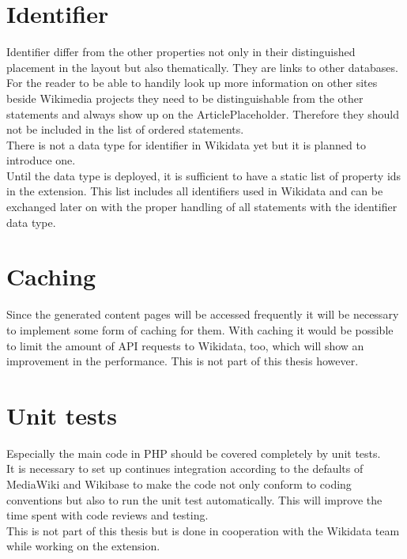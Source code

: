 \section {Identifier}
Identifier differ from the other properties not only in their distinguished placement in the layout but also thematically. They are links to other databases. For the reader to be able to handily look up more information on other sites beside Wikimedia projects they need to be distinguishable from the other statements and always show up on the ArticlePlaceholder. Therefore they should not be included in the list of ordered statements. \\
There is not a data type for identifier in Wikidata yet but it is planned to introduce one. \\
Until the data type is deployed, it is sufficient to have a static list of property ids in the extension. This list includes all identifiers used in Wikidata and can be exchanged later on with the proper handling of all statements with the identifier data type.

\section{Caching}
Since the generated content pages will be accessed frequently  it will be necessary to implement some form of caching for them. With caching it would be possible to limit the amount of API requests to Wikidata, too, which will show an improvement in the performance. This is not part of this thesis however.

\section {Unit tests}
Especially the main code in PHP should be covered completely by unit tests.\\
It is necessary to set up continues integration according to the defaults of MediaWiki and Wikibase to make the code not only conform to coding conventions but also to run the unit test automatically. This will improve the time spent with code reviews and testing. \\
This is not part of this thesis but is done in cooperation with the Wikidata team while working on the extension.